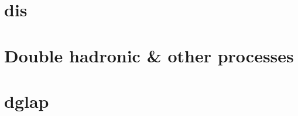 \section{\acrlong{dis}}
\label{sec:qcd/dis}
% 

\section{Double hadronic \& other processes}
\label{sec:qcd/dy}
% 

\section{\acrlong{dglap}}
\label{sec:qcd/dglap}
% 
